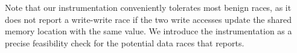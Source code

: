 Note that our instrumentation conveniently tolerates most benign races, as it
does not report a write-write race if the two write accesses update the shared
memory location with the same value.  We introduce the instrumentation as a
precise feasibility check for the potential data races that \whoop reports. 


